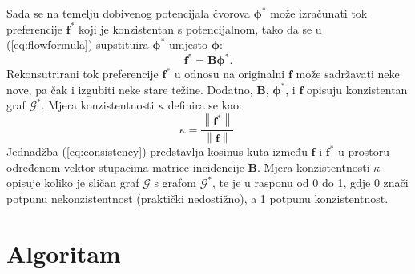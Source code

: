 \documentclass[lmodern, utf8, diplomski, numeric]{fer}
\newcommand{\matr}[1]{\mathbold{#1}}
\newcommand{\graph}[1]{\mathcal{#1}}
\begin{document}
  Sada se na temelju dobivenog potencijala čvorova $\matr{\phi^*}$ može izračunati tok preferencije $\matr{f^*}$ koji je konzistentan s potencijalnom, tako da se u (\ref{eq:flowformula}) supstituira $\matr{\phi^*}$ umjesto $\matr{\phi}$:
  \begin{equation}
  \matr{f^*} = \matr{B} \matr{\phi^*}.
  \end{equation}
  Rekonsutrirani tok preferencije $\matr{f^*}$ u odnosu na originalni $\matr{f}$ može sadržavati neke nove, pa čak i izgubiti neke stare težine.
  Dodatno, $\matr{B}$, $\matr{\phi^*}$, i $\matr{f}$ opisuju konzistentan graf $\graph{G}^*$.
  Mjera konzistentnosti $\kappa$ definira se kao:
  \begin{equation}
  \label{eq:consistency}
  \kappa = \frac{\left \lVert \matr{f^*} \right \rVert}{\left \lVert \matr{f} \right \rVert}.
  \end{equation}
  Jednadžba (\ref{eq:consistency}) predstavlja kosinus kuta između $\matr{f}$ i $\matr{f^*}$ u prostoru određenom vektor stupacima matrice incidencije $\matr{B}$.
  Mjera konzistentnosti $\kappa$ opisuje koliko je sličan graf $\graph{G}$ s grafom $\graph{G}^*$, te je u rasponu od 0 do 1, gdje 0 znači potpunu nekonzistentnost (praktički nedostižno), a 1 potpunu konzistentnost.
  
  
\chapter{Algoritam}
\end{document}
